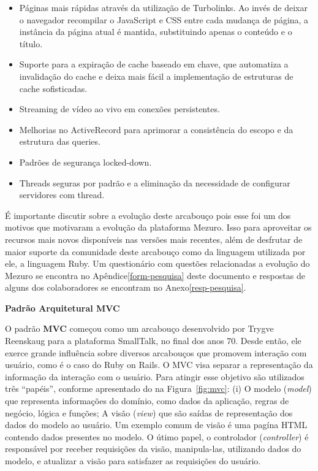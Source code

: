 \begin{itemize}

	\item Páginas mais rápidas através da utilização de Turbolinks. Ao invés de deixar o navegador recompilar o JavaScript e CSS entre cada mudança de página, a instância da página atual é mantida, substituindo apenas o conteúdo e o título.

	\item Suporte para a expiração de cache baseado em chave, que automatiza a invalidação do cache e deixa mais fácil a implementação de estruturas de cache sofisticadas.

	\item Streaming de vídeo ao vivo em conexões persistentes.

	\item Melhorias no ActiveRecord para aprimorar a consistência do escopo e da estrutura das queries.

	\item Padrões de segurança locked-down.

	\item Threads seguras por padrão e a eliminação da necessidade de configurar servidores com thread.

\end{itemize}


É importante discutir sobre a evolução deste arcabouço pois esse foi um dos motivos que motivaram a evolução da plataforma Mezuro. Isso para aproveitar os recursos mais novos disponíveis nas versões mais recentes, além de desfrutar de maior suporte da comunidade deste arcabouço como da linguagem utilizada por ele, a linguagem Ruby. Um questionário com questões relacionadas a evolução do Mezuro se encontra no Apêndice\ref{form-pesquisa} deste documento e respostas de alguns dos colaboradores  se encontram no Anexo\ref{resp-pesquisa}.


\textbf{Padrão Arquitetural MVC}

O padrão \textbf{MVC} começou como um arcabouço desenvolvido por Trygve Reenskaug para a plataforma SmallTalk, no final dos anos 70. Desde então, ele exerce grande influência sobre diversos arcabouços que promovem interação com usuário, como é o caso do Ruby on Rails.
%
O MVC visa separar a representação da informação da interação com o usuário. Para atingir esse objetivo são utilizados três ``papéis'', conforme apresentado do na Figura~\ref{fig:mvc}:
%
(i) O modelo (\textit{model}) que representa informações do domínio, como dados
da aplicação, regras de negócio, lógica e funções;
%
A visão (\textit{view}) que são saídas de representação dos dados do modelo ao
usuário. Um exemplo comum de visão é uma pagína HTML contendo dados presentes
no modelo.
%
O útimo papel, o controlador (\textit{controller}) é responsável por receber
requisições da visão, manipula-las, utilizando dados do modelo, e atualizar a
visão para satisfazer as requisições do usuário.

